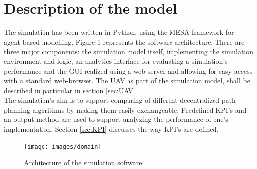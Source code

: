 \section{Description of the model}\label{sec:model}
The simulation has been written in Python, using the MESA \cite{masad.2015} framework for agent-based modelling. Figure 1 represents the software architecture. There are three major components: the simulation model itself, implementing the simulation environment and logic, an analytics interface for evaluating a simulation's performance and the GUI realized using a web server and allowing for easy access with a standard web-browser. The UAV as part of the simulation model, shall be described in particular in section \ref{sec:UAV}.\\
The simulation's aim is to support comparing of different decentralized path-planning algorithms by making them easily exchangeable. Predefined KPI's and an output method are used to support analyzing the performance of one's implementation. Section \ref{sec:KPI} discusses the way KPI's are defined.\\
\begin{figure}[tbp]\label{fig:architecture}
	\centering
	\texttt{[image: images/domain]} 
	\caption{Architecture of the simulation software}
\end{figure}


